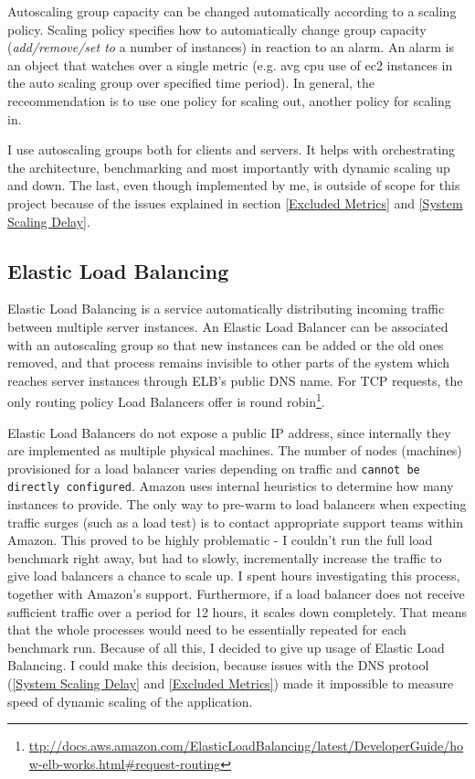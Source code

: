 \documentclass{uvamscse}
\begin{document}
Autoscaling group capacity can be changed automatically according to a scaling policy. Scaling policy specifies how to automatically change group capacity (\textit{add/remove/set to} a number of instances) in reaction to an alarm. An alarm is an object that watches over a single metric (e.g. avg cpu use of ec2 instances in the auto scaling group over specified time period). In general, the receommendation is to use one policy for scaling out, another policy for scaling in.

I use autoscaling groups both for clients and servers. It helps with orchestrating the architecture, benchmarking and most importantly with dynamic scaling up and down. The last, even though implemented by me, is outside of scope for this project because of the issues explained in section \ref{Excluded Metrics} and \ref{System Scaling Delay}.

\subsection{Elastic Load Balancing}\label{Load balancing}
Elastic Load Balancing is a service automatically distributing incoming traffic between multiple server instances. An Elastic Load Balancer can be associated with an autoscaling group so that new instances can be added or the old ones removed, and that process remains invisible to other parts of the system which reaches server instances through ELB's public DNS name. For TCP requests, the only routing policy Load Balancers offer is round robin\footnote{\url{ttp://docs.aws.amazon.com/ElasticLoadBalancing/latest/DeveloperGuide/how-elb-works.html\#request-routing}}.

Elastic Load Balancers do not expose a public IP address, since internally they are implemented as multiple physical machines. The number of nodes (machines) provisioned for a load balancer varies depending on traffic and \texttt{cannot be directly configured}. Amazon uses internal heuristics to determine how many instances to provide. The only way to pre-warm to load balancers when expecting traffic surges (such as a load test) is to contact appropriate support teams within Amazon. This proved to be highly problematic - I couldn't run the full load benchmark right away, but had to slowly, incrementally increase the traffic to give load balancers a chance to scale up. I spent hours investigating this process, together with Amazon's support. Furthermore, if a load balancer does not receive sufficient traffic over a period for 12 hours, it scales down completely. That means that the whole processes would need to be essentially repeated for each benchmark run. Because of all this, I decided to give up usage of Elastic Load Balancing. I could make this decision, because issues with the DNS protool (\ref{System Scaling Delay} and \ref{Excluded Metrics}) made it impossible to measure speed of dynamic scaling of the application.
\end{document}
